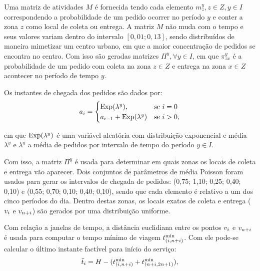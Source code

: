 Uma matriz de atividades $M$ é fornecida tendo cada elemento 
$m_z^y, z \in Z, y \in I$ correspondendo a probabilidade de um pedido 
ocorrer no período $y$ e conter a zona $z$ como local de coleta ou entrega. 
A matriz $M$ não muda com o tempo e seus valores variam dentro do intervalo
$[0,01; 0,13]$, sendo distribuídos de maneira mimetizar um centro urbano, em
que a maior concentração de pedidos se encontra no centro.
Com isso são geradas matrizes $\Pi^y, \forall y \in I$, em que $\pi_{zx}^y$ é a
probabilidade de um pedido com coleta na zona $z \in Z$ e entrega na zona $x
\in Z$ acontecer no período de tempo $y$.

Os instantes de chegada dos pedidos são dados por:
%
\begin{equation}
   a_{i} =
   \begin{cases}
       \text{Exp}(\lambda^y),                     & \text{se $i = 0$} \\
       a_{i-1} +\text{Exp}(\lambda^y) & \text{se $i > 0$},
     \end{cases}
\end{equation}

\noindent em que $\text{Exp}(\lambda^y)$ é uma variável aleatória com 
distribuição exponencial e média $\lambda^y$ e $\lambda^y$ a média de pedidos 
por intervalo de tempo do período $y \in I$.

Com isso, a matriz $\Pi^y$ é usada para determinar em quais zonas os locais de 
coleta e entrega vão aparecer. 
Dois conjuntos de parâmetros de média Poisson foram usados para gerar os 
intervalos de chegada de pedidos: (0,75; 1,10; 0,25; 0,40; 0,10) e 
(0,55; 0,70; 0,10; 0,40; 0,10), sendo que cada elemento é relativo a
um dos cinco períodos do dia. 
Dentro destas zonas, os locais exatos de coleta e entrega 
($v_{i}$ e $v_{n + i}$) são gerados por uma distribuição uniforme.


Com relação a janelas de tempo, a distância euclidiana entre os pontos 
$v_{i}$ e $v_{n + i}$ é usada para computar o tempo mínimo de 
viagem $t_{(i,n + i)}^{\min}$.
Com ele pode-se calcular o último instante factível para início do serviço:
%
\begin{equation}
  \Tilde{t}_{i} = H 
    - (t_{(i,n + i)}^{\min} 
    + t_{(n + i,2n + 1)}^{\min}),
    \label{eq:gendreau2006_leat_feasible_time}
\end{equation}

